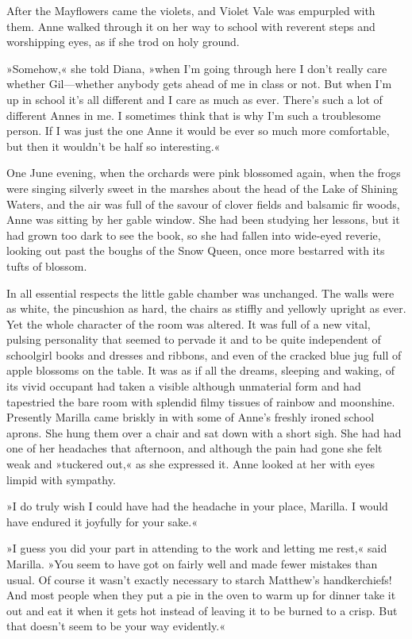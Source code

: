 After the Mayflowers came the violets, and Violet Vale was empurpled with them. Anne walked through it on her way to school with reverent steps and worshipping eyes, as if she trod on holy ground.

»Somehow,« she told Diana, »when I'm going through here I don't really care whether Gil—whether anybody gets ahead of me in class or not. But when I'm up in school it's all different and I care as much as ever. There's such a lot of different Annes in me. I sometimes think that is why I'm such a troublesome person. If I was just the one Anne it would be ever so much more comfortable, but then it wouldn't be half so interesting.«

One June evening, when the orchards were pink blossomed again, when the frogs were singing silverly sweet in the marshes about the head of the Lake of Shining Waters, and the air was full of the savour of clover fields and balsamic fir woods, Anne was sitting by her gable window. She had been studying her lessons, but it had grown too dark to see the book, so she had fallen into wide-eyed reverie, looking out past the boughs of the Snow Queen, once more bestarred with its tufts of blossom.

In all essential respects the little gable chamber was unchanged. The walls were as white, the pincushion as hard, the chairs as stiffly and yellowly upright as ever. Yet the whole character of the room was altered. It was full of a new vital, pulsing personality that seemed to pervade it and to be quite independent of schoolgirl books and dresses and ribbons, and even of the cracked blue jug full of apple blossoms on the table. It was as if all the dreams, sleeping and waking, of its vivid occupant had taken a visible although unmaterial form and had tapestried the bare room with splendid filmy tissues of rainbow and moonshine. Presently Marilla came briskly in with some of Anne's freshly ironed school aprons. She hung them over a chair and sat down with a short sigh. She had had one of her headaches that afternoon, and although the pain had gone she felt weak and »tuckered out,« as she expressed it. Anne looked at her with eyes limpid with sympathy.

»I do truly wish I could have had the headache in your place, Marilla. I would have endured it joyfully for your sake.«

»I guess you did your part in attending to the work and letting me rest,« said Marilla. »You seem to have got on fairly well and made fewer mistakes than usual. Of course it wasn't exactly necessary to starch Matthew's handkerchiefs! And most people when they put a pie in the oven to warm up for dinner take it out and eat it when it gets hot instead of leaving it to be burned to a crisp. But that doesn't seem to be your way evidently.«

